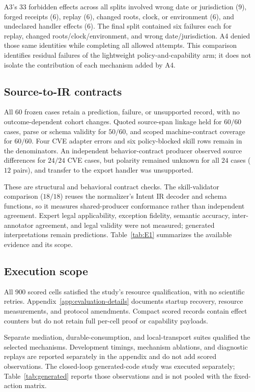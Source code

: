 A3's $33$ forbidden effects across all splits involved wrong date or jurisdiction ($9$), forged receipts ($6$), replay ($6$), changed roots, clock, or environment ($6$), and undeclared handler effects ($6$). The final split contained six failures each for replay, changed roots/clock/environment, and wrong date/jurisdiction. A4 denied those same identities while completing all allowed attempts. This comparison identifies residual failures of the lightweight policy-and-capability arm; it does not isolate the contribution of each mechanism added by A4.

\subsection{Source-to-IR contracts}
\label{sec:eval-source}

All $60$ frozen cases retain a prediction, failure, or unsupported record, with no outcome-dependent cohort changes. Quoted source-span linkage held for $60/60$ cases, parse or schema validity for $50/60$, and scoped machine-contract coverage for $60/60$. Four CVE adapter errors and six policy-blocked skill rows remain in the denominators. An independent behavior-contract producer observed source differences for $24/24$ CVE cases, but polarity remained unknown for all $24$ cases ($12$ pairs), and transfer to the export handler was unsupported.

These are structural and behavioral contract checks. The skill-validator comparison ($18/18$) reuses the normalizer's Intent IR decoder and schema functions, so it measures shared-producer conformance rather than independent agreement. Expert legal applicability, exception fidelity, semantic accuracy, inter-annotator agreement, and legal validity were not measured; generated interpretations remain predictions. Table~\ref{tab:E1} summarizes the available evidence and its scope.

\subsection{Execution scope}
\label{sec:eval-negative}

All $900$ scored cells satisfied the study's resource qualification, with no scientific retries. Appendix~\ref{app:evaluation-details} documents startup recovery, resource measurements, and protocol amendments. Compact scored records contain effect counters but do not retain full per-cell proof or capability payloads.

Separate mediation, durable-consumption, and local-transport suites qualified the selected mechanisms. Development timings, mechanism ablations, and diagnostic replays are reported separately in the appendix and do not add scored observations. The closed-loop generated-code study was executed separately; Table~\ref{tab:generated} reports those observations and is not pooled with the fixed-action matrix.
